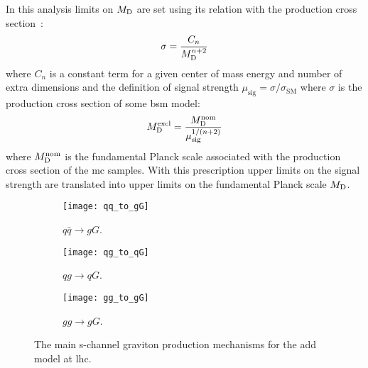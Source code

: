 In this analysis limits on $M_\mathrm{D}$ are set using its relation with the production
cross section~\cite{ADDPhenomenology}:
\begin{equation}
  \label{eq:113}
  \sigma = \frac{C_n}{M_\mathrm{D}^{n + 2}}
\end{equation}
where $C_n$ is a constant term for a given center of mass energy and number of
extra dimensions and the definition of signal strength
$\mu_\mathrm{sig} = \sigma/\sigma_\mathrm{SM}$ where $\sigma$ is the production
cross section of some \gls{bsm} model:
\begin{equation}
  \label{eq:114}
  M_\mathrm{D}^\mathrm{excl} = \frac{M_\mathrm{D}^\mathrm{nom}}{\mu^{1/(n + 2)}_\mathrm{sig}}
\end{equation}
where $M_\mathrm{D}^\mathrm{nom}$ is the fundamental Planck scale associated with the
production cross section of the \gls{mc} samples. With this prescription upper
limits on the signal strength are translated into upper limits on the
fundamental Planck scale $M_\mathrm{D}$.

\begin{figure}[!h]
  \centering
  \begin{subfigure}{.48\linewidth}
    \texttt{[image: qq\_to\_gG]}
    \caption{$q \bar{q} \rightarrow g G$.}
  \end{subfigure}
  \begin{subfigure}{.48\linewidth}
    \texttt{[image: qg\_to\_qG]}
    \caption{$q g \rightarrow q G$.}
  \end{subfigure}
  \begin{subfigure}{.48\linewidth}
    \texttt{[image: gg\_to\_gG]}
    \caption{$g g \rightarrow g G$.}
  \end{subfigure}
  \caption{The main s-channel graviton production mechanisms for the \gls{add}
    model at \gls{lhc}.}
  \label{fig:add_feynman}
\end{figure}
